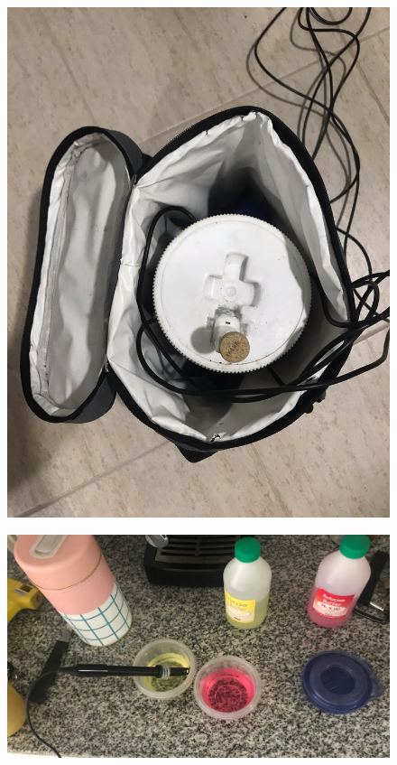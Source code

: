     \begin{figure}
        \centering
        \includegraphics[scale=0.10]{Anexo/FotosExperimentos/P5.jpeg}
        \label{fig:ConstrucAislamTerm}
    \end{figure}
    
    \begin{figure}
        \centering
        \includegraphics[scale=0.10]{Anexo/FotosExperimentos/P6.jpg}
        \label{fig:CalibrPhimetro}
    \end{figure}
        
